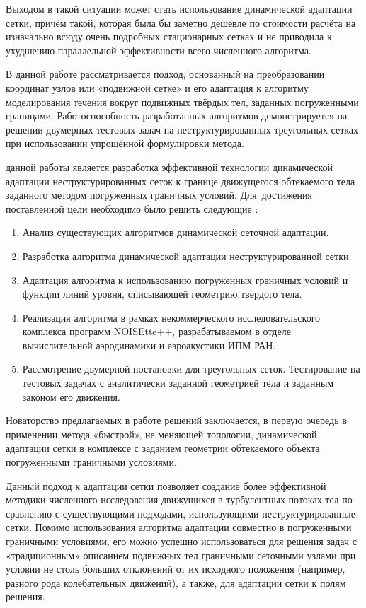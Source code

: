 Выходом в такой ситуации может стать использование динамической адаптации сетки, причём такой, которая была бы заметно дешевле по стоимости расчёта на изначально всюду очень подробных стационарных сетках и не приводила к ухудшению параллельной эффективности всего численного алгоритма. 

В данной работе рассматривается подход, основанный на преобразовании координат узлов или «подвижной сетке» и его адаптация к алгоритму моделирования течения вокруг подвижных твёрдых тел, заданных погруженными границами. Работоспособность разработанных алгоритмов демонстрируется на решении двумерных тестовых задач на неструктурированных треугольных сетках при использовании упрощённой формулировки метода.

{\aim} данной работы является разработка эффективной технологии динамической адаптации неструктурированных сеток к границе движущегося обтекаемого тела заданного методом погруженных граничных условий. Для~достижения поставленной цели необходимо было решить следующие {\tasks}:
\begin{enumerate}
	\item Анализ существующих алгоритмов динамической сеточной адаптации.
  \item  Разработка алгоритма динамической адаптации неструктурированной сетки. 
   \item Адаптация алгоритма к использованию погруженных граничных условий и функции линий уровня, описывающей геометрию твёрдого тела.
  \item Реализация алгоритма в рамках некоммерческого исследовательского комплекса программ NOISEtte++, разрабатываемом в отделе вычислительной аэродинамики и аэроакустики ИПМ РАН.
  \item Рассмотрение двумерной постановки для треугольных сеток. Тестирование на тестовых задачах с аналитически заданной геометрией тела и заданным законом его движения.
\end{enumerate}

{\novelty}
Новаторство предлагаемых в работе решений заключается, в первую очередь в применении метода «быстрой», не меняющей топологии, динамической адаптации сетки в комплексе с заданием геометрии обтекаемого объекта погруженными граничными условиями. 

{\influence} Данный подход к адаптации сетки позволяет создание более эффективной методики численного исследования движущихся в турбулентных потоках тел по сравнению с существующими подходами, использующими неструктурированные сетки.  Помимо использования алгоритма адаптации совместно в погруженными граничными условиями, его можно успешно использоваться для решения задач с «традиционным» описанием подвижных тел граничными сеточными узлами при условии не столь
больших отклонений от их исходного положения (например, разного рода 
колебательных движений), а также, для адаптации сетки к полям решения.

